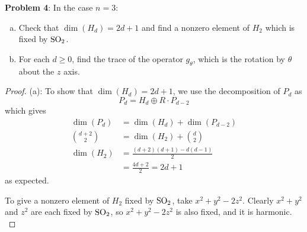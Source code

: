 \documentclass{amsart}
\begin{document}
	\newpage
	\noindent \textbf{Problem 4}: In the case $n=3$: 
	\begin{enumerate}[(a)]
		\item Check that $\dim (H_d)=2d+1$ and find a nonzero element of $H_2$ which is fixed by $\operatorname{SO}_2$.
		\item For each $d\geq 0$, find the trace of the operator $g_{\theta}$, which is the rotation by $\theta$ about the $z$ axis. 
	\end{enumerate}
	\begin{proof}
		(a): To show that $\dim(H_d)=2d+1$, we use the decomposition of $P_d$ as
		$$
		P_d = H_d\oplus R\cdot P_{d-2}
		$$
		which gives
		\begin{align*}
		\dim(P_d) &= \dim(H_d) + \dim(P_{d-2})\\
		{d+2 \choose 2} &= \dim(H_2) + {d \choose 2}\\
		\dim(H_2) &= \frac{(d+2)(d+1)-d(d-1)}{2} \\
		&= \frac{4d+2}{2}=2d+1
		\end{align*}
		as expected.
		
		
		
		To give a nonzero element of $H_2$ fixed by $\operatorname{SO}_2$, take $x^2+y^2-2z^2$. Clearly $x^2+y^2$ and $z^2$ are each fixed by $\operatorname{SO}_2$, so $x^2+y^2-2z^2$ is also fixed, and it is harmonic.\\
		

\end{proof}
\end{document}
